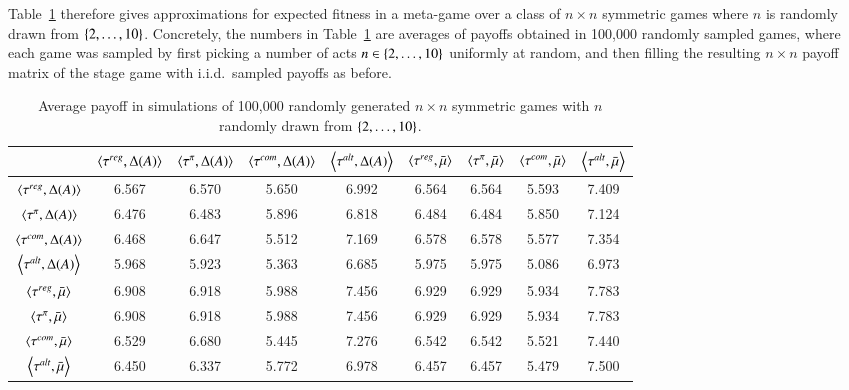 \documentclass[fleqn,reqno,11pt]{article}
\begin{document}
Table~\ref{tab:ExpectedFitness_10x10} therefore gives approximations for expected fitness in a
meta-game over a class of $n \times n$ symmetric games where $n$ is randomly drawn from
$\left\{2, \dots, 10\right\}$. Concretely, the numbers in Table~\ref{tab:ExpectedFitness_10x10} are
averages of payoffs obtained in 100,000 randomly sampled games, where each game was sampled by
first picking a number of acts $n \in \left\{2, \dots, 10\right\}$ uniformly at random, and then filling
the resulting $n \times n$ payoff matrix of the stage game with i.i.d.~sampled payoffs as
before.


\begin{table}[]
\centering
\footnotesize
\begin{tabular}{ccccccccc}
  \toprule
 & $\left \langle \tau^{reg}, \Delta(A)\right\rangle$ 
 & $\left \langle \tau^{\pi}, \Delta(A)\right\rangle$ 
 & $\left \langle \tau^{com}, \Delta(A)\right\rangle$
 & $\left \langle \tau^{alt}, \Delta(A)\right\rangle$
 & $\left \langle \tau^{reg}, \bar{\mu}\right\rangle$ 
 & $\left \langle \tau^{\pi}, \bar{\mu}\right\rangle$ 
 & $\left \langle \tau^{com}, \bar{\mu}\right\rangle$
 & $\left \langle \tau^{alt}, \bar{\mu}\right\rangle$ \\ 
  \midrule
  $\left \langle \tau^{reg}, \Delta(A)\right\rangle$ & 6.567 & 6.570 & 5.650 & 6.992 & 6.564 & 6.564 & 5.593 & 7.409 \\
  $\left \langle \tau^{\pi}, \Delta(A)\right\rangle$ & 6.476 & 6.483 & 5.896 & 6.818 & 6.484 & 6.484 & 5.850 & 7.124 \\
  $\left \langle \tau^{com}, \Delta(A)\right\rangle$ & 6.468 & 6.647 & 5.512 & 7.169 & 6.578 & 6.578 & 5.577 & 7.354 \\
  $\left \langle \tau^{alt}, \Delta(A)\right\rangle$ & 5.968 & 5.923 & 5.363 & 6.685 & 5.975 & 5.975 & 5.086 & 6.973 \\
  $\left \langle \tau^{reg}, \bar{\mu}\right\rangle$ & 6.908 & 6.918 & 5.988 & 7.456 & 6.929 & 6.929 & 5.934 & 7.783 \\
  $\left \langle \tau^{\pi}, \bar{\mu}\right\rangle$ & 6.908 & 6.918 & 5.988 & 7.456 & 6.929 & 6.929 & 5.934 & 7.783 \\
  $\left \langle \tau^{com}, \bar{\mu}\right\rangle$ & 6.529 & 6.680 & 5.445 & 7.276 & 6.542 & 6.542 & 5.521 & 7.440 \\
  $\left \langle \tau^{alt}, \bar{\mu}\right\rangle$ & 6.450 & 6.337 & 5.772 & 6.978 & 6.457 & 6.457 & 5.479 & 7.500 \\
   \bottomrule                         
\end{tabular}                      
\caption{Average payoff in simulations of 100,000
  randomly generated $n \times n$ symmetric games with $n$ randomly drawn from $\left\{2, \dots, 10\right\}$.}
\label{tab:ExpectedFitness_10x10}        
\end{table}
\end{document}
